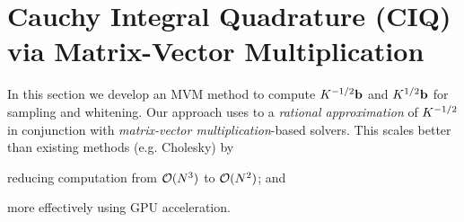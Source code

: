 \section{Cauchy Integral Quadrature (CIQ) via Matrix-Vector Multiplication}
\label{sec:ciq_method}

In this section we develop an MVM method to compute $K^{-1/2} \mathbf{b}$ and $K^{1/2} \mathbf{b}$ for sampling and whitening.
Our approach uses to a \emph{rational approximation} of $K^{-1/2}$ in conjunction with \emph{matrix-vector multiplication}-based solvers.
This scales better than existing methods (e.g. Cholesky) by
\begin{enumerate*}
  \item reducing computation from $\bigo{N^3}$ to $\bigo{N^2}$; and
  \item more effectively using GPU acceleration.
\end{enumerate*}

